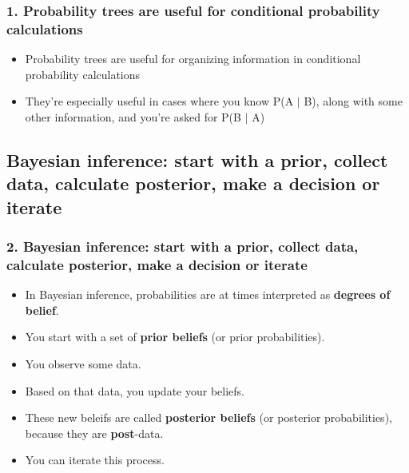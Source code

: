 \documentclass[11pt,containsverbatim,handout,xcolor=xelatex,dvipsnames,table]{beamer}
\begin{document}

\begin{frame}
\frametitle{1. Probability trees are useful for conditional probability calculations}

\begin{itemize}

\item Probability trees are useful for organizing information in conditional probability calculations

\item They're especially useful in cases where you know P(A $|$ B), along with some other information, and you're asked for P(B $|$ A)

\end{itemize}

\end{frame}


\subsection{Bayesian inference: start with a prior, collect data, calculate posterior, make a decision or iterate}
\label{mi2}


\begin{frame}
\frametitle{2. Bayesian inference: start with a prior, collect data, calculate posterior, make a decision or iterate}

\begin{itemize}[<+->]

\item In Bayesian inference, probabilities are at times interpreted as \textbf{degrees of belief}.

\item You start with a set of \textbf{prior beliefs} (or prior probabilities).

\item You observe some data.

\item Based on that data, you update your beliefs.  

\item These new beleifs are called \textbf{posterior beliefs} (or posterior probabilities), because they are \textbf{post}-data.

\item You can iterate this process.

\end{itemize}

\end{frame}
\end{document}
